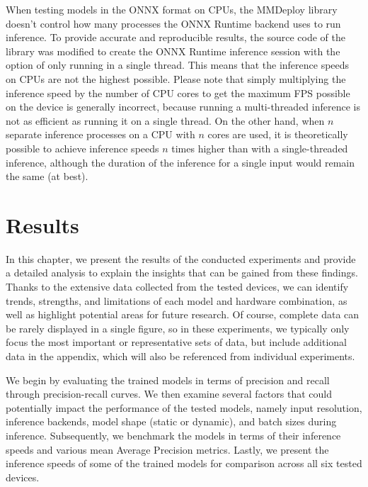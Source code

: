 When testing models in the ONNX format on CPUs, the MMDeploy library doesn't
control how many processes the ONNX Runtime backend uses to run inference. To
provide accurate and reproducible results, the source code of the library was
modified to create the ONNX Runtime inference session with the option of only
running in a single thread. This means that the inference speeds on CPUs are not
the highest possible. Please note that simply multiplying the inference speed by
the number of CPU cores to get the maximum FPS possible on the device is
generally incorrect, because running a multi-threaded inference is not as
efficient as running it on a single thread. On the other hand, when $n$ separate
inference processes on a CPU with $n$ cores are used, it is theoretically
possible to achieve inference speeds $n$ times higher than with a
single-threaded inference, although the duration of the inference for a single
input would remain the same (at best).







\chapter{Results}
\label{Results}

In this chapter, we present the results of the conducted experiments and provide
a detailed analysis to explain the insights that can be gained from these
findings. Thanks to the extensive data collected from the tested devices, we can
identify trends, strengths, and limitations of each model and hardware
combination, as well as highlight potential areas for future research. Of
course, complete data can be rarely displayed in a single figure, so in these
experiments, we typically only focus the most important or representative sets
of data, but include additional data in the appendix, which will also be
referenced from individual experiments.

We begin by evaluating the trained models in terms of precision and recall
through precision-recall curves. We then examine several factors that could
potentially impact the performance of the tested models, namely input
resolution, inference backends, model shape (static or dynamic), and batch sizes
during inference. Subsequently, we benchmark the models in terms of their
inference speeds and various mean Average Precision metrics. Lastly, we present
the inference speeds of some of the trained models for comparison across all six
tested devices.


